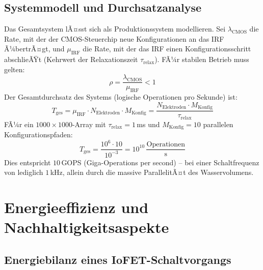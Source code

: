 ﻿\documentclass[a4paper,12pt]{scrreprt}
\theoremstyle{definition}
\begin{document}
\subsection{Systemmodell und Durchsatzanalyse}

Das Gesamtsystem lÃ¤sst sich als Produktionssystem modellieren. Sei
$\lambda_{\mathrm{CMOS}}$ die Rate, mit der der CMOS-Steuerchip neue
Konfigurationen an das IRF Ã¼bertrÃ¤gt, und $\mu_{\mathrm{IRF}}$ die Rate,
mit der das IRF einen Konfigurationsschritt abschlieÃŸt (Kehrwert der
Relaxationszeit $\tau_{\mathrm{relax}}$). FÃ¼r stabilen Betrieb muss gelten:
\begin{equation}
	\rho = \frac{\lambda_{\mathrm{CMOS}}}{\mu_{\mathrm{IRF}}} < 1
	\label{eq:stabilitaetsbedingung}
\end{equation}
Der Gesamtdurchsatz des Systems (logische Operationen pro Sekunde) ist:
\begin{equation}
	T_{\mathrm{ges}} = \mu_{\mathrm{IRF}} \cdot N_{\mathrm{Elektroden}} \cdot M_{\mathrm{Konfig}}
	= \frac{N_{\mathrm{Elektroden}} \cdot M_{\mathrm{Konfig}}}{\tau_{\mathrm{relax}}}
	\label{eq:gesamtdurchsatz}
\end{equation}
FÃ¼r ein $1000 \times 1000$-Array mit $\tau_{\mathrm{relax}} = 1$\,ms und
$M_{\mathrm{Konfig}} = 10$ parallelen Konfigurationspfaden:
\begin{equation}
	T_{\mathrm{ges}} = \frac{10^6 \cdot 10}{10^{-3}} = 10^{10}\,\frac{\mathrm{Operationen}}{\mathrm{s}}
	\label{eq:durchsatz_beispiel}
\end{equation}
Dies entspricht $10$\,GOPS (Giga-Operations per second) -- bei einer
Schaltfrequenz von lediglich $1$\,kHz, allein durch die massive ParallelitÃ¤t
des Wasservolumens.

\section{Energieeffizienz und Nachhaltigkeitsaspekte}

\subsection{Energiebilanz eines IoFET-Schaltvorgangs}
\end{document}
